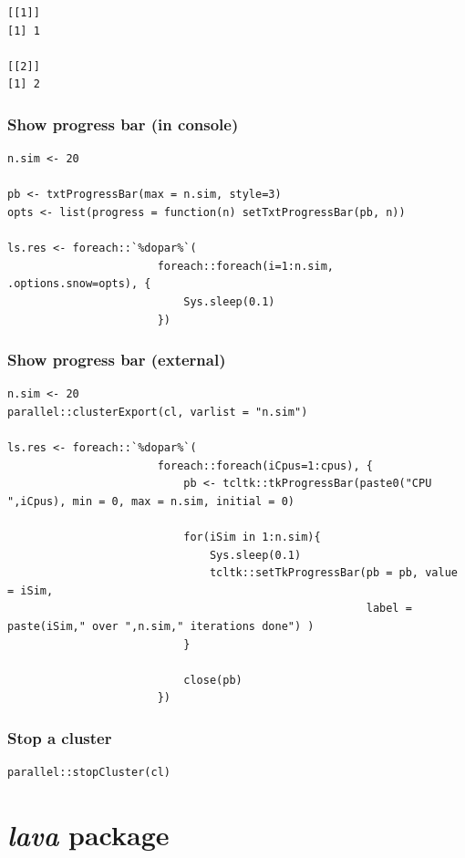 \documentclass{article}
\begin{document}
\begin{verbatim}
[[1]]
[1] 1

[[2]]
[1] 2
\end{verbatim}

\subsubsection{Show progress bar (in console)}
\label{sec:org51218eb}

\lstset{language=r,label= ,caption= ,captionpos=b,numbers=none}
\begin{lstlisting}
n.sim <- 20

pb <- txtProgressBar(max = n.sim, style=3)
opts <- list(progress = function(n) setTxtProgressBar(pb, n))

ls.res <- foreach::`%dopar%`(
					   foreach::foreach(i=1:n.sim, .options.snow=opts), {
						   Sys.sleep(0.1)
					   })
\end{lstlisting}

\subsubsection{Show progress bar (external)}
\label{sec:org4f51e69}

\lstset{language=r,label= ,caption= ,captionpos=b,numbers=none}
\begin{lstlisting}
n.sim <- 20
parallel::clusterExport(cl, varlist = "n.sim")

ls.res <- foreach::`%dopar%`(
					   foreach::foreach(iCpus=1:cpus), {
						   pb <- tcltk::tkProgressBar(paste0("CPU ",iCpus), min = 0, max = n.sim, initial = 0)

						   for(iSim in 1:n.sim){
							   Sys.sleep(0.1)
							   tcltk::setTkProgressBar(pb = pb, value = iSim,
													   label = paste(iSim," over ",n.sim," iterations done") )
						   }

						   close(pb)
					   })
\end{lstlisting}

\subsubsection{Stop a cluster}
\label{sec:org734d1cf}

\lstset{language=r,label= ,caption= ,captionpos=b,numbers=none}
\begin{lstlisting}
parallel::stopCluster(cl)
\end{lstlisting}

\section{\emph{lava} package}
\label{sec:orgb502055}
\end{document}
